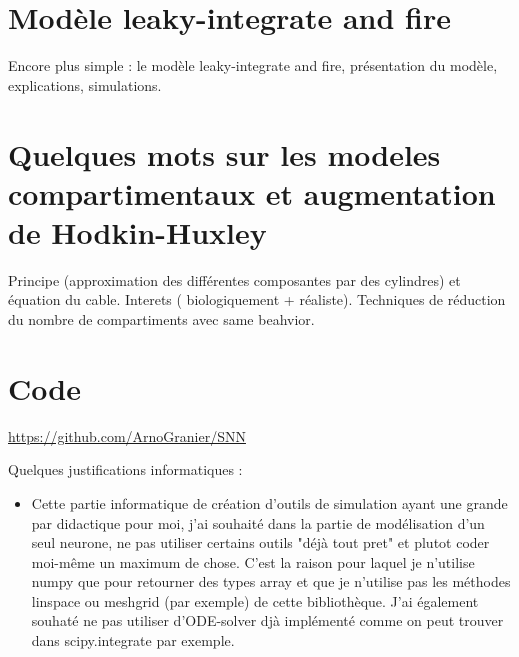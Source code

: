 \documentclass[12pt]{scrartcl}
\begin{document}
\section{Modèle leaky-integrate and fire}
	Encore plus simple : le modèle leaky-integrate and fire, présentation du modèle, explications, simulations.


\section{Quelques mots sur les modeles compartimentaux et augmentation de Hodkin-Huxley}
	Principe (approximation des différentes composantes par des cylindres) et équation du cable. Interets ( biologiquement + réaliste). Techniques de réduction du nombre de compartiments avec same beahvior. 

\nocite{*}

\pagebreak

\section{Code}
\url{https://github.com/ArnoGranier/SNN}

Quelques justifications informatiques :
\begin{itemize} \item Cette partie informatique de création d'outils de simulation ayant une grande par didactique pour moi, j'ai souhaité dans la partie de modélisation d'un seul neurone, ne pas utiliser certains outils "déjà tout pret" et plutot coder moi-même un maximum de chose. C'est la raison pour laquel je n'utilise numpy que pour retourner des types array et que je n'utilise pas les méthodes linspace ou meshgrid (par exemple) de cette bibliothèque. J'ai également souhaté ne pas utiliser d'ODE-solver djà implémenté comme on peut trouver dans scipy.integrate par exemple. \end{itemize}



\end{document}
